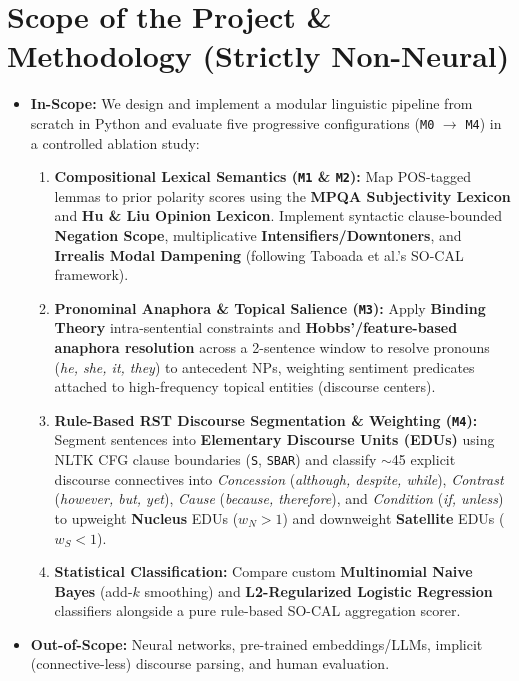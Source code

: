 \documentclass[11pt,a4paper]{article}
\begin{document}
\section{Scope of the Project \& Methodology (Strictly Non-Neural)}
\begin{itemize}
    \item \textbf{In-Scope:} We design and implement a modular linguistic pipeline from scratch in Python and evaluate five progressive configurations (\texttt{M0} $\to$ \texttt{M4}) in a controlled ablation study:
    \begin{enumerate}
        \item \textbf{Compositional Lexical Semantics (\texttt{M1} \& \texttt{M2}):} Map POS-tagged lemmas to prior polarity scores using the \textbf{MPQA Subjectivity Lexicon} and \textbf{Hu \& Liu Opinion Lexicon}. Implement syntactic clause-bounded \textbf{Negation Scope}, multiplicative \textbf{Intensifiers/Downtoners}, and \textbf{Irrealis Modal Dampening} (following Taboada et al.'s SO-CAL framework).
        \item \textbf{Pronominal Anaphora \& Topical Salience (\texttt{M3}):} Apply \textbf{Binding Theory} intra-sentential constraints and \textbf{Hobbs'/feature-based anaphora resolution} across a 2-sentence window to resolve pronouns (\textit{he, she, it, they}) to antecedent NPs, weighting sentiment predicates attached to high-frequency topical entities (discourse centers).
        \item \textbf{Rule-Based RST Discourse Segmentation \& Weighting (\texttt{M4}):} Segment sentences into \textbf{Elementary Discourse Units (EDUs)} using NLTK CFG clause boundaries (\texttt{S}, \texttt{SBAR}) and classify $\sim$45 explicit discourse connectives into \textit{Concession} (\textit{although, despite, while}), \textit{Contrast} (\textit{however, but, yet}), \textit{Cause} (\textit{because, therefore}), and \textit{Condition} (\textit{if, unless}) to upweight \textbf{Nucleus} EDUs ($w_N > 1$) and downweight \textbf{Satellite} EDUs ($w_S < 1$).
        \item \textbf{Statistical Classification:} Compare custom \textbf{Multinomial Naive Bayes} (add-$k$ smoothing) and \textbf{L2-Regularized Logistic Regression} classifiers alongside a pure rule-based SO-CAL aggregation scorer.
    \end{enumerate}
    \item \textbf{Out-of-Scope:} Neural networks, pre-trained embeddings/LLMs, implicit (connective-less) discourse parsing, and human evaluation.
\end{itemize}
\end{document}
